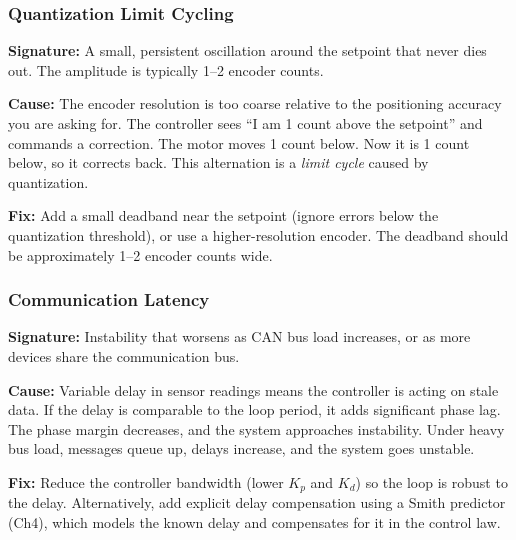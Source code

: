 \subsubsection{Quantization Limit Cycling}

\textbf{Signature:} A small, persistent oscillation around the setpoint that never dies out. The amplitude is typically 1--2 encoder counts.

\textbf{Cause:} The encoder resolution is too coarse relative to the positioning accuracy you are asking for. The controller sees ``I am 1 count above the setpoint'' and commands a correction. The motor moves 1 count below. Now it is 1 count below, so it corrects back. This alternation is a \textit{limit cycle} caused by quantization.

\textbf{Fix:} Add a small deadband near the setpoint (ignore errors below the quantization threshold), or use a higher-resolution encoder. The deadband should be approximately 1--2 encoder counts wide.

\subsubsection{Communication Latency}

\textbf{Signature:} Instability that worsens as CAN bus load increases, or as more devices share the communication bus.

\textbf{Cause:} Variable delay in sensor readings means the controller is acting on stale data. If the delay is comparable to the loop period, it adds significant phase lag. The phase margin decreases, and the system approaches instability. Under heavy bus load, messages queue up, delays increase, and the system goes unstable.

\textbf{Fix:} Reduce the controller bandwidth (lower $K_p$ and $K_d$) so the loop is robust to the delay. Alternatively, add explicit delay compensation using a Smith predictor (Ch4), which models the known delay and compensates for it in the control law.



